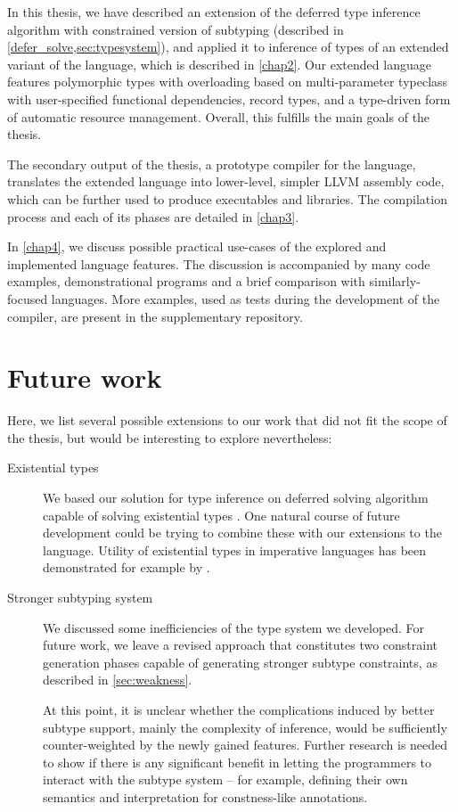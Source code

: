 

In this thesis, we have described an extension of the deferred type inference algorithm with constrained version of subtyping (described in \cref{defer_solve,sec:typesystem}), and applied it to inference of types of an extended variant of the \cmm language, which is described in \cref{chap2}. Our extended \cmm language features polymorphic types with overloading based on multi-parameter typeclass with user-specified functional dependencies, record types, and a type-driven form of automatic resource management. Overall, this fulfills the main goals of the thesis.

The secondary output of the thesis, a prototype compiler for the language, translates the extended \cmm language into lower-level, simpler LLVM assembly code, which can be further used to produce executables and libraries. The compilation process and each of its phases are detailed in \cref{chap3}.

In \cref{chap4}, we discuss possible practical use-cases of the explored and implemented language features. The discussion is accompanied by many code examples, demonstrational programs and a brief comparison with similarly-focused languages. More examples, used as tests during the development of the compiler, are present in the supplementary repository\cmmrepo.

\section*{Future work}

Here, we list several possible extensions to our work that did not fit the scope of the thesis, but would be interesting to explore nevertheless:

\begin{description}
    \item[Existential types] We based our solution for type inference on deferred solving algorithm capable of solving existential types \cite{vytiniotis2011outsidein}. One natural course of future development could be trying to combine these with our extensions to the language. Utility of existential types in imperative languages has been demonstrated for example by \citet{grossman2002existential}.

    \item[Stronger subtyping system] We discussed some inefficiencies of the type system we developed. For future work, we leave a revised approach that constitutes two constraint generation phases capable of generating stronger subtype constraints, as described in \cref{sec:weakness}.

    At this point, it is unclear whether the complications induced by better subtype support, mainly the complexity of inference, would be sufficiently counter-weighted by the newly gained features. Further research is needed to show if there is any significant benefit in letting the programmers to interact with the subtype system -- for example, defining their own semantics and interpretation for constness-like annotations.
\end{description}
